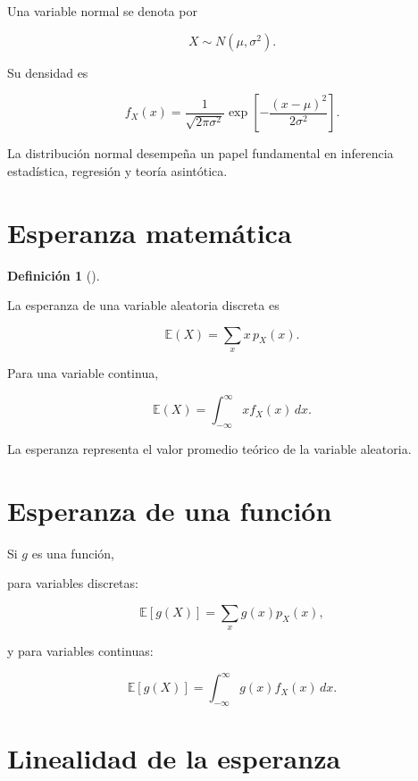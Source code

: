 \documentclass[
  spanish,
  10.5pt,
  letterpaper,
  DIV=11,
  numbers=noendperiod,
  oneside,
  open=any]{scrreprt}
\theoremstyle{definition}
\newtheorem{definition}{Definición}[chapter]
\theoremstyle{definition}
\theoremstyle{plain}
\theoremstyle{remark}
\begin{document}

Una variable normal se denota por

\[
X\sim N(\mu,\sigma^2).
\]

Su densidad es

\[
f_X(x)
=
\frac{1}{\sqrt{2\pi\sigma^2}}
\exp
\left[
-\frac{(x-\mu)^2}{2\sigma^2}
\right].
\]

La distribución normal desempeña un papel fundamental en inferencia
estadística, regresión y teoría asintótica.

\section*{Esperanza matemática}\label{esperanza-matemuxe1tica}


\begin{definition}[]\protect\hypertarget{def-esperanza}{}\label{def-esperanza}

La esperanza de una variable aleatoria discreta es

\[
\mathbb{E}(X)
=
\sum_x x\,p_X(x).
\]

Para una variable continua,

\[
\mathbb{E}(X)
=
\int_{-\infty}^{\infty}
x f_X(x)\,dx.
\]

\end{definition}

La esperanza representa el valor promedio teórico de la variable
aleatoria.

\section*{Esperanza de una función}\label{esperanza-de-una-funciuxf3n}


Si \(g\) es una función,

para variables discretas:

\[
\mathbb{E}[g(X)]
=
\sum_x g(x)p_X(x),
\]

y para variables continuas:

\[
\mathbb{E}[g(X)]
=
\int_{-\infty}^{\infty}
g(x)f_X(x)\,dx.
\]

\section*{Linealidad de la esperanza}\label{linealidad-de-la-esperanza}
\end{document}
